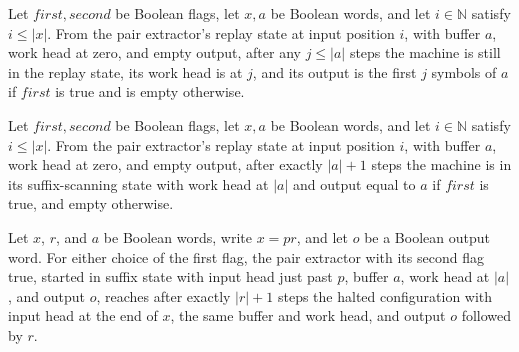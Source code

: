 \begin{lemma}
\label{Turing.FinTM.extract_replay}
\leanok
{}
Let $first,second$ be Boolean flags, let $x,a$ be Boolean words, and let $i\in\mathbb N$
satisfy $i\le |x|$. From the pair extractor's replay state at input position $i$, with
buffer $a$, work head at zero, and empty output, after any $j\le |a|$ steps the machine
is still in the replay state, its work head is at $j$, and its output is the first $j$
symbols of $a$ if $first$ is true and is empty otherwise.
\end{lemma}

\begin{lemma}
\label{Turing.FinTM.extract_replay_finish}
\leanok
{}
Let $first,second$ be Boolean flags, let $x,a$ be Boolean words, and let $i\in\mathbb N$
satisfy $i\le |x|$. From the pair extractor's replay state at input position $i$, with
buffer $a$, work head at zero, and empty output, after exactly $|a|+1$ steps the machine
is in its suffix-scanning state with work head at $|a|$ and output equal to $a$ if
$first$ is true, and empty otherwise.
\end{lemma}

\begin{lemma}
\label{Turing.FinTM.extract_suffix}
\leanok
{}
Let $x$, $r$, and $a$ be Boolean words, write $x=p r$, and let $o$ be a Boolean output
word. For either choice of the first flag, the pair extractor with its second flag true,
started in suffix state with input head just past $p$, buffer $a$, work head at $|a|$,
and output $o$, reaches after exactly $|r|+1$ steps the halted configuration with input
head at the end of $x$, the same buffer and work head, and output $o$ followed by $r$.
\end{lemma}

